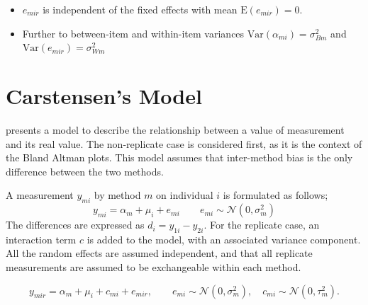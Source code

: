 \documentclass[12pt, a4paper]{report}
\theoremstyle{plain}
\theoremstyle{definition}
\theoremstyle{remark}
\begin{document}
	\begin{itemize}
		\item $e_{mir}$ is independent of the fixed effects with mean $\mbox{E}(e_{mir}) = 0$.
		\item Further to \citet{barnhart} between-item and within-item variances $\mbox{Var}(\alpha_{mi}) = \sigma^2_{Bm}$ and $\mbox{Var}(e_{mir}) = \sigma^2_{Wm}$
		
	\end{itemize}

	\section{Carstensen's Model}
	
	\citet{BXC2004} presents a model to describe the relationship between a value of measurement and its
	real value. The non-replicate case is considered first, as it is the context of the Bland Altman plots. This model assumes that inter-method bias is the only difference between the two methods.
	
	A measurement $y_{mi}$ by method $m$ on individual $i$ is formulated as follows;
	\begin{equation}
	y_{mi}  = \alpha_{m} + \mu_{i} + e_{mi} \qquad  e_{mi} \sim
	\mathcal{N}(0,\sigma^{2}_{m})
	\end{equation}
	The differences are expressed as $d_{i} = y_{1i} - y_{2i}$. For the replicate case, an interaction term $c$ is added to the model, with an associated variance component. All the random effects are assumed independent, and that all replicate measurements are assumed to be exchangeable within each method.
	
	\begin{equation}
	y_{mir}  = \alpha_{m} + \mu_{i} + c_{mi} + e_{mir}, \qquad  e_{mi}
	\sim \mathcal{N}(0,\sigma^{2}_{m}), \quad c_{mi} \sim \mathcal{N}(0,\tau^{2}_{m}).
	\end{equation}
	
\end{document}
